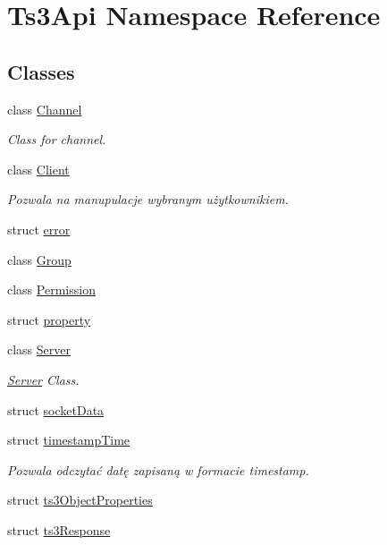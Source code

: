 \hypertarget{namespace_ts3_api}{}\section{Ts3\+Api Namespace Reference}
\label{namespace_ts3_api}
\subsection*{Classes}
\begin{DoxyCompactItemize}
\item 
class \hyperlink{class_ts3_api_1_1_channel}{Channel}
\begin{DoxyCompactList}\small\item\em Class for channel. \end{DoxyCompactList}\item 
class \hyperlink{class_ts3_api_1_1_client}{Client}
\begin{DoxyCompactList}\small\item\em Pozwala na manupulacje wybranym użytkownikiem. \end{DoxyCompactList}\item 
struct \hyperlink{struct_ts3_api_1_1error}{error}
\item 
class \hyperlink{class_ts3_api_1_1_group}{Group}
\item 
class \hyperlink{class_ts3_api_1_1_permission}{Permission}
\item 
struct \hyperlink{struct_ts3_api_1_1property}{property}
\item 
class \hyperlink{class_ts3_api_1_1_server}{Server}
\begin{DoxyCompactList}\small\item\em \hyperlink{class_ts3_api_1_1_server}{Server} Class. \end{DoxyCompactList}\item 
struct \hyperlink{struct_ts3_api_1_1socket_data}{socket\+Data}
\item 
struct \hyperlink{struct_ts3_api_1_1timestamp_time}{timestamp\+Time}
\begin{DoxyCompactList}\small\item\em Pozwala odczytać datę zapisaną w formacie timestamp. \end{DoxyCompactList}\item 
struct \hyperlink{struct_ts3_api_1_1ts3_object_properties}{ts3\+Object\+Properties}
\item 
struct \hyperlink{struct_ts3_api_1_1ts3_response}{ts3\+Response}
\end{DoxyCompactItemize}
